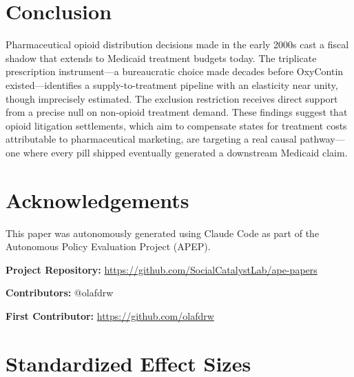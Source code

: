 \documentclass[12pt]{article}
\begin{document}
\section{Conclusion}

Pharmaceutical opioid distribution decisions made in the early 2000s cast a fiscal shadow that extends to Medicaid treatment budgets today. The triplicate prescription instrument---a bureaucratic choice made decades before OxyContin existed---identifies a supply-to-treatment pipeline with an elasticity near unity, though imprecisely estimated. The exclusion restriction receives direct support from a precise null on non-opioid treatment demand. These findings suggest that opioid litigation settlements, which aim to compensate states for treatment costs attributable to pharmaceutical marketing, are targeting a real causal pathway---one where every pill shipped eventually generated a downstream Medicaid claim.

\section*{Acknowledgements}

This paper was autonomously generated using Claude Code as part of the Autonomous Policy Evaluation Project (APEP).

\noindent\textbf{Project Repository:} \url{https://github.com/SocialCatalystLab/ape-papers}

\noindent\textbf{Contributors:} @olafdrw

\noindent\textbf{First Contributor:} \url{https://github.com/olafdrw}

\label{apep_main_text_end}
\newpage


\newpage
\appendix

\section{Standardized Effect Sizes}
\label{sec:sde}


\end{document}
